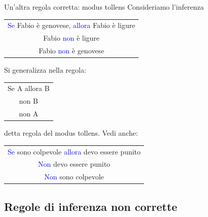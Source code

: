 \documentclass[aspectratio=169,10pt]{beamer}
\newcommand{\conn}[1]{\textcolor{blue}{#1}}
\newenvironment{inference}{\begin{tabular}{c}}{\end{tabular}}
\begin{document}
\begin{frame}{Un'altra regola corretta: modus tollens}
	Consideriamo l'inferenza
	\begin{center}
		\begin{inference}
			\conn{Se} Fabio è genovese, \conn{allora} Fabio è ligure\\
			Fabio \conn{non} è ligure\\
			\hline
			Fabio \conn{non} è genovese
		\end{inference}
	\end{center}
	\pause
	Si generalizza nella regola:
	\begin{center}
		\begin{inference}
			Se A allora B\\
			non B\\
			\hline
			non A
		\end{inference}
	\end{center}
	detta \alert{regola del modus tollens}. Vedi anche:
	\begin{center}
		\begin{inference}
			\conn{Se} sono colpevole \conn{allora} devo essere punito\\
			\conn{Non} devo essere punito\\
			\hline
			\conn{Non} sono colpevole
		\end{inference}
	\end{center}
\end{frame}

\subsection{Regole di inferenza non corrette}
\end{document}
